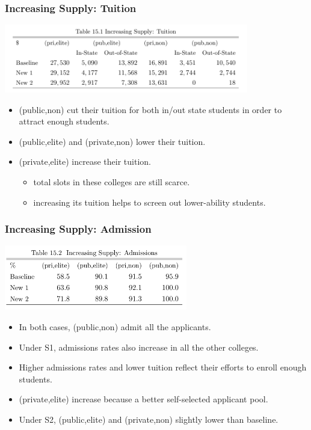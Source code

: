 \documentclass[10pt]{beamer}
\begin{document}
\begin{frame}[c]\frametitle{Increasing Supply: Tuition}

\centerline{\includegraphics[width=0.8\textwidth]{table151.png}}
\begin{itemize}
    \item (public,non) cut their tuition for both in/out state students in order to attract enough students.
    \item (public,elite) and (private,non) lower their tuition.
    \item (private,elite) increase their tuition.
    \begin{itemize}
        \item  total slots in these colleges are still scarce.
        \item  increasing its tuition helps to screen out lower-ability students.
    \end{itemize}

\end{itemize}

\end{frame}

\begin{frame}[c]\frametitle{Increasing Supply: Admission}
\centerline{\includegraphics[width=0.6\textwidth]{table152.png}}
\begin{itemize}
    \item In both cases, (public,non) admit all the applicants.
    \item Under S1, admissions rates also increase in all the other colleges.
    \item Higher admissions rates and lower tuition reflect their efforts to enroll enough students.
    \item (private,elite) increase because  a better self-selected applicant pool.
    \item Under S2, (public,elite) and (private,non) slightly lower than baseline.
\end{itemize}


\end{frame}
\end{document}
